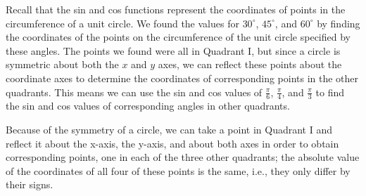\label{les_7:part_4_intro_to_trig_functions}

Recall that the sin and cos functions represent the coordinates of points in the
circumference of a unit circle. We found the values for $30^{\circ}$,
$45^{\circ}$, and $60^{\circ}$ by finding the coordinates of the points on the
circumference of the unit circle specified by these angles. The points we found
were all in Quadrant I, but since a circle is symmetric about both the $x$ and
$y$ axes, we can reflect these points about the coordinate axes to determine the
coordinates of corresponding points in the other quadrants. This means we can
use the sin and cos values of $\frac{\pi}{6}$, $\frac{\pi}{4}$, and
$\frac{\pi}{3}$ to find the sin and cos values of corresponding angles in other
quadrants.

Because of the symmetry of a circle, we can take a point in Quadrant I and
reflect it about the x-axis, the y-axis, and about both axes in order to obtain
corresponding points, one in each of the three other quadrants; the absolute
value of the coordinates of all four of these points is the same, i.e., they
only differ by their signs.

